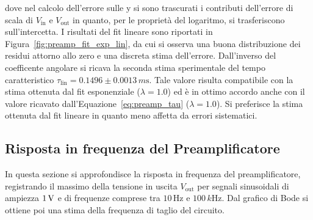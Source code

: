 dove nel calcolo dell'errore sulle y si sono trascurati i contributi dell'errore di scala
di $V_{\text{in}}$ e $V_{\text{out}}$ in quanto, per le proprietà del logaritmo, si trasferiscono sull'intercetta.
I risultati del fit lineare sono riportati in Figura~\ref{fig:preamp_fit_exp_lin}, da cui si
osserva una buona distribuzione dei residui attorno allo zero e una
discreta stima dell'errore. Dall'inverso del coefficente angolare si ricava
la seconda stima sperimentale del tempo caratteristico $\tau_{\text{lin}}=0.1496\pm0.0013 \,\si{m\s}$. Tale valore risulta compatibile con la stima
ottenuta dal fit esponenziale ($\lambda=1.0$) ed è in ottimo accordo anche con il valore
ricavato dall'Equazione~\ref{eq:preamp_tau} ($\lambda=1.0$). Si preferisce la stima
ottenuta dal fit lineare in quanto meno affetta da errori sistematici.

\subsection{Risposta in frequenza del Preamplificatore}\label{sec:preamp_bode}
In questa sezione si approfondisce la risposta in frequenza del preamplificatore, registrando il massimo della tensione in uscita
$V_{\text{out}}$ per segnali sinusoidali di ampiezza $1\,\si{\volt}$
e di frequenze comprese tra $10\,\si{\Hz}$ e $100\,\si{k\Hz}$. Dal grafico di Bode si ottiene poi una stima della
frequenza di taglio del circuito.

